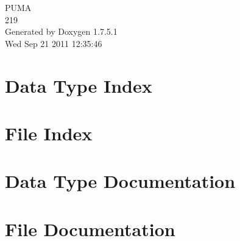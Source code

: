 \documentclass[a4paper]{book}
\begin{document}
\hypersetup{pageanchor=false,citecolor=blue}
\begin{titlepage}
\vspace*{7cm}
\begin{center}
{\Large \-P\-U\-M\-A \\[1ex]\large 219 }\\
\vspace*{1cm}
{\large \-Generated by Doxygen 1.7.5.1}\\
\vspace*{0.5cm}
{\small Wed Sep 21 2011 12:35:46}\\
\end{center}
\end{titlepage}
\clearemptydoublepage
{}
\tableofcontents
\clearemptydoublepage
{}
\hypersetup{pageanchor=true,citecolor=blue}
\chapter{\-Data \-Type \-Index}

\chapter{\-File \-Index}

\chapter{\-Data \-Type \-Documentation}

















\chapter{\-File \-Documentation}














\printindex
\end{document}
